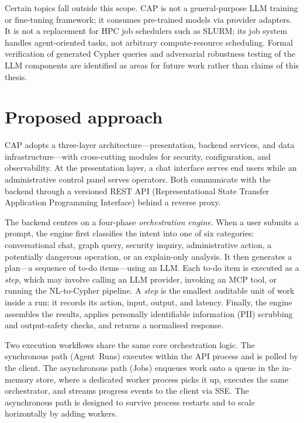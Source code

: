 \documentclass[a4paper,noexaminfo]{sapthesis}
\begin{document}
Certain topics fall outside this scope.  CAP is not a general-purpose LLM
training or fine-tuning framework; it consumes pre-trained models via
provider adapters.  It is not a replacement for HPC job schedulers such as
SLURM; its job system handles agent-oriented tasks, not arbitrary
compute-resource scheduling.  Formal verification of generated Cypher
queries and adversarial robustness testing of the LLM components are
identified as areas for future work rather than claims of this thesis.

\section{Proposed approach}
\label{sec:proposed-approach}

CAP adopts a three-layer architecture---presentation, backend services, and
data infrastructure---with cross-cutting modules for security, configuration,
and observability.  At the presentation layer, a chat interface serves end
users while an administrative control panel serves operators.  Both
communicate with the backend through a versioned REST API
(Representational State Transfer Application Programming Interface) behind
a reverse proxy.

The backend centres on a four-phase \emph{orchestration engine}.  When a
user submits a prompt, the engine first classifies the intent into one of
six categories: conversational chat, graph query, security inquiry,
administrative action, a potentially dangerous operation, or an
explain-only analysis.  It then generates a plan---a sequence of to-do
items---using an LLM.  Each to-do item is executed as a \emph{step}, which
may involve calling an LLM provider, invoking an MCP tool, or running the
NL-to-Cypher pipeline.  A \emph{step} is the smallest auditable unit of
work inside a run: it records its action, input, output, and latency.
Finally, the engine assembles the results, applies personally
identifiable information (PII) scrubbing and output-safety checks, and
returns a normalised response.

Two execution workflows share the same core orchestration logic.
The synchronous path (Agent~Runs) executes within the API process and is
polled by the client.  The asynchronous path (Jobs) enqueues work onto a
queue in the in-memory store, where a dedicated worker process picks it up, executes the
same orchestrator, and streams progress events to the client via SSE.  The
asynchronous path is designed to survive process restarts and to scale
horizontally by adding workers.
\end{document}
